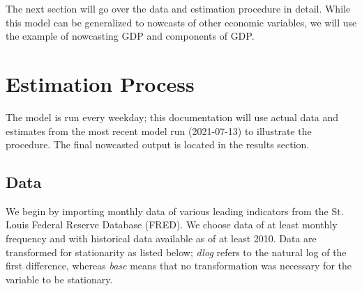 \documentclass[11pt, letterpaper]{article}\usepackage[]{graphicx}\usepackage[]{color}
\begin{document}
The next section will go over the data and estimation procedure in detail. While this model can be generalized to nowcasts of other economic variables, we will use the example of nowcasting GDP and components of GDP.

\newpage
\section{Estimation Process}
The model is run every weekday; this documentation will use actual data and estimates from the most recent model run (2021-07-13) to illustrate the procedure. The final nowcasted output is located in the results section.

\subsection{Data}
We begin by importing monthly data of various leading indicators from the St. Louis Federal Reserve Database (FRED). We choose data of at least monthly frequency and with historical data available as of at least 2010. Data are transformed for stationarity as listed below; \textit{dlog} refers to the natural log of the first difference, whereas \textit{base} means that no transformation was necessary for the variable to be stationary.
\end{document}
